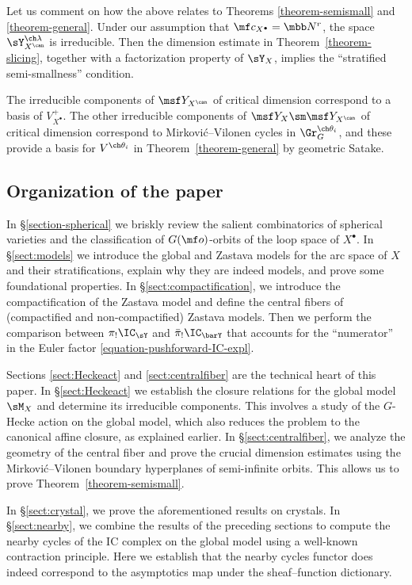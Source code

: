 \documentclass[final]{amsart}
\theoremstyle{remark}
\theoremstyle{definition}
\numberwithin{equation}{section}
\begin{document}
Let us comment on how the above relates to Theorems \ref{theorem-semismall} and \ref{theorem-general}. 
Under our assumption that $\mf c_{X^\bullet} = \mbb N^r$, the space $\sY^{\ch\lambda}_{X^\can}$ 
is irreducible. 
Then the dimension estimate in Theorem~\ref{theorem-slicing}, together with a factorization property 
of $\sY_X$, implies the ``stratified semi-smallness'' condition. 

The irreducible components of $\msf Y_{X^\can}$ of critical dimension 
correspond to a basis of $V^+_{X^\bullet}$. The other irreducible components of $\msf Y_X \sm \msf Y_{X^\can}$
of critical dimension correspond to Mirkovi\'c--Vilonen cycles in $\Gr_G^{\ch\theta_i}$, and
these provide a basis for $V^{\ch\theta_i}$ in Theorem~\ref{theorem-general} by geometric Satake. 

\subsection{Organization of the paper}
In \S\ref{section-spherical} we briskly review the salient combinatorics
of spherical varieties and the classification of $G(\mf o)$-orbits of the loop
space of $X^\bullet$. In \S\ref{sect:models} we introduce the
global and Zastava models for the arc space of $X$ and their stratifications, explain why they are indeed models,
and prove some foundational properties. In \S\ref{sect:compactification}, we
introduce the compactification of the Zastava model and define the
central fibers of (compactified and non-compactified) Zastava models. Then we 
perform the comparison between $\pi_!\IC_{\sY}$ and $\bar\pi_! \IC_{\barY}$ 
that accounts for the ``numerator'' in the Euler factor \eqref{equation-pushforward-IC-expl}. 

Sections \ref{sect:Heckeact} and \ref{sect:centralfiber} are the 
technical heart of this paper. In \S\ref{sect:Heckeact} we establish 
the closure relations for the global model $\sM_X$ and determine its irreducible
components. This involves a study of the $G$-Hecke action on the global model,
which also reduces the problem to the canonical affine closure, as explained 
earlier. In \S\ref{sect:centralfiber}, we analyze the geometry of the
central fiber and prove the crucial dimension estimates using the
Mirkovi\'c--Vilonen boundary hyperplanes of semi-infinite orbits. 
This allows us to prove Theorem~\ref{theorem-semismall}. 

In \S\ref{sect:crystal}, we prove the aforementioned results on crystals. 
In \S\ref{sect:nearby}, we combine the results of the preceding sections to 
compute the nearby cycles of the IC complex on the global model using a 
well-known contraction principle. Here we establish that 
the nearby cycles functor does indeed correspond to the asymptotics map under 
the sheaf--function dictionary. 
\end{document}
